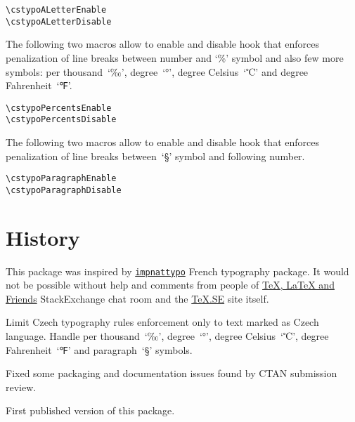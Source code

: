 \documentclass[paper=B5,DIV=calc,parskip=half]{scrartcl}
\begin{document}
\begin{lstlisting}[style=myLatexStyle]
\cstypoALetterEnable
\cstypoALetterDisable
\end{lstlisting}

The following two macros allow to enable and disable hook that enforces
penalization of line breaks between number and \enquote*{\%} symbol and also
few more symbols: per thousand~\enquote*{‰}, degree~\enquote*{°}, degree
Celsius~\enquote*{℃} and degree Fahrenheit~\enquote*{℉}.

\begin{lstlisting}[style=myLatexStyle]
\cstypoPercentsEnable
\cstypoPercentsDisable
\end{lstlisting}

The following two macros allow to enable and disable hook that enforces
penalization of line breaks between~\enquote*{§} symbol and following number.

\begin{lstlisting}[style=myLatexStyle]
\cstypoParagraphEnable
\cstypoParagraphDisable
\end{lstlisting}


\section{History}

This package was inspired by
\texttt{\href{http://www.ctan.org/pkg/impnattypo}{impnattypo}} French
typography package. It would not be possible without help and comments from
people of
\href{http://chat.stackexchange.com/rooms/41/tex-latex-and-friends}{\TeX{},
  \LaTeX{} and Friends} StackExchange chat room and the
\href{http://tex.stackexchange.com/}{\TeX.SE} site itself.

\begin{description}[style=nextline, labelwidth=4.5em, leftmargin=!, labelindent=0em]
\item[\texttt{v0.03}] Limit Czech typography rules enforcement only to text
  marked as Czech language. Handle per thousand~\enquote*{‰},
  degree~\enquote*{°}, degree Celsius~\enquote*{℃}, degree
  Fahrenheit~\enquote*{℉} and paragraph~\enquote*{§} symbols.
\item[\texttt{v0.02}] Fixed some packaging and documentation issues found by
  CTAN submission review.
\item[\texttt{v0.01}] First published version of this package.
\end{description}
\end{document}
